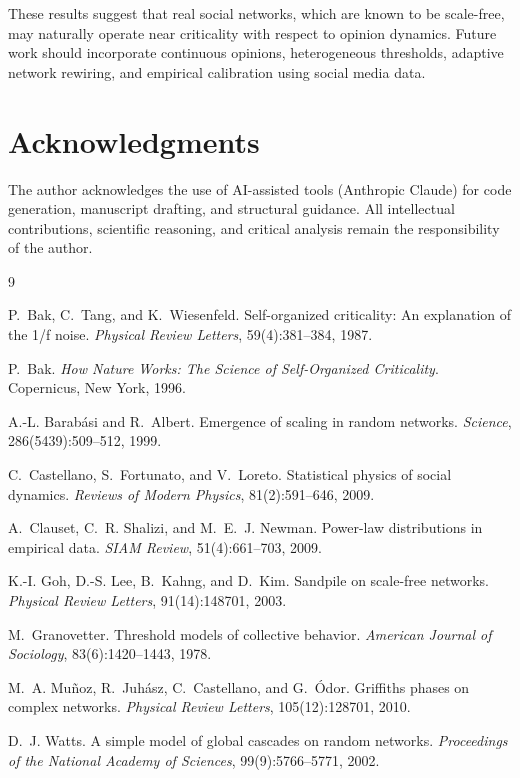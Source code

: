 \documentclass[11pt,twocolumn]{article}
\begin{document}
These results suggest that real social networks, which are known to be scale-free, may naturally operate near criticality with respect to opinion dynamics. Future work should incorporate continuous opinions, heterogeneous thresholds, adaptive network rewiring, and empirical calibration using social media data.

\section*{Acknowledgments}

The author acknowledges the use of AI-assisted tools (Anthropic Claude) for code generation, manuscript drafting, and structural guidance. All intellectual contributions, scientific reasoning, and critical analysis remain the responsibility of the author.


\begin{thebibliography}{9}

P.~Bak, C.~Tang, and K.~Wiesenfeld.
\newblock Self-organized criticality: An explanation of the 1/f noise.
\newblock \emph{Physical Review Letters}, 59(4):381--384, 1987.

P.~Bak.
\newblock \emph{How Nature Works: The Science of Self-Organized Criticality}.
\newblock Copernicus, New York, 1996.

A.-L. Barab\'asi and R.~Albert.
\newblock Emergence of scaling in random networks.
\newblock \emph{Science}, 286(5439):509--512, 1999.

C.~Castellano, S.~Fortunato, and V.~Loreto.
\newblock Statistical physics of social dynamics.
\newblock \emph{Reviews of Modern Physics}, 81(2):591--646, 2009.

A.~Clauset, C.~R. Shalizi, and M.~E.~J. Newman.
\newblock Power-law distributions in empirical data.
\newblock \emph{SIAM Review}, 51(4):661--703, 2009.

K.-I. Goh, D.-S. Lee, B.~Kahng, and D.~Kim.
\newblock Sandpile on scale-free networks.
\newblock \emph{Physical Review Letters}, 91(14):148701, 2003.

M.~Granovetter.
\newblock Threshold models of collective behavior.
\newblock \emph{American Journal of Sociology}, 83(6):1420--1443, 1978.

M.~A. Mu\~noz, R.~Juh\'asz, C.~Castellano, and G.~\'Odor.
\newblock Griffiths phases on complex networks.
\newblock \emph{Physical Review Letters}, 105(12):128701, 2010.

D.~J. Watts.
\newblock A simple model of global cascades on random networks.
\newblock \emph{Proceedings of the National Academy of Sciences}, 99(9):5766--5771, 2002.

\end{thebibliography}
\end{document}
